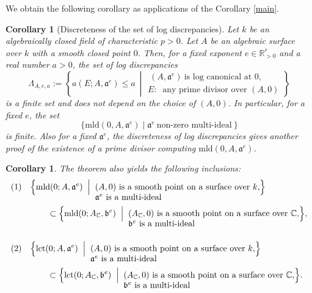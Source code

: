 \documentclass[a4paper]{amsart}
\def\RR{{\mathbb{R}}}
\def\CC{{\mathbb{C}}}
\renewcommand{\a}{{\mathfrak{a}}}
\newcommand{\mld}{{\mathrm{mld}}}
\newcommand{\lct}{{\operatorname{lct}}}
\newtheorem{cor}[thm]{Corollary}
\theoremstyle{definition}
\begin{document}
We obtain the following corollary as  applications of the Corollary \ref{main}.
 
   \begin{cor}[Discreteness of the set of log discrepancies]\label{equal-p-0}   Let  $k$ be an algebraically closed field of 
       characteristic $p>0$.
       Let $A$ be an algebraic surface over $k$ with a smooth closed point $0$. 
              Then, 
            for a fixed exponent $e\in \RR_{>0}^r$ and a real number $a>0$, the set of log discrepancies 
         $$\Lambda_{A,e,a}:=\left\{a(E;A,\a^e) \leq a \ \middle | \begin{array}{l}\ (A, \a^e)\ \mbox{is\ log\ canonical\ at $0$}, 
         \\ E:\ \mbox{\ any \ prime divisor\ over } (A,0) \end{array}\right\} $$
         is a finite set and does not depend on the choice of $(A,0)$.   
         In particular, for a  fixed  $e$, the set 
         $$\{\mld(0,A, \a^e) \mid \a^e\ \mbox{non-zero\ multi-ideal}\ \}$$ 
         is finite.
         Also for a fixed $\a^e$, the discreteness of log discrepancies gives another proof of  the existence of a prime divisor computing $\mld(0,A, \a^e)$.
    \end{cor}

\begin{cor}\label{mld-contain}
  The theorem also yields the following inclusions:
\[
\begin{aligned}
(1)\quad
&\Bigl\{
   \mld(0;A,\mathfrak a^e)
   \;\Bigm|\;
   \begin{array}[t]{@{}l@{}}
     (A,0)\text{ is a smooth point on a surface over }k,\\
     \mathfrak a^e\text{ is a multi-ideal}
   \end{array}
 \Bigr\} \\
&\qquad\subset
 \Bigl\{
   \mld(0;A_{\CC},\mathfrak b^e)
   \;\Bigm|\;
   \begin{array}[t]{@{}l@{}}
     (A_{\CC},0)\text{ is a smooth point on a surface over }\CC,\\
     \mathfrak b^e\text{ is a multi-ideal}
   \end{array}
 \Bigr\}, \\[1em]
(2)\quad
&\Bigl\{
   \lct(0;A,\mathfrak a^e)
   \;\Bigm|\;
   \begin{array}[t]{@{}l@{}}
     (A,0)\text{ is a smooth point on a surface over }k,\\
     \mathfrak a^e\text{ is a multi-ideal}
   \end{array}
 \Bigr\} \\
&\qquad\subset
 \Bigl\{
   \lct(0;A_{\CC},\mathfrak b^e)
   \;\Bigm|\;
   \begin{array}[t]{@{}l@{}}
     (A_{\CC},0)\text{ is a smooth point on a surface over }\CC,\\
     \mathfrak b^e\text{ is a multi-ideal}
   \end{array}
 \Bigr\}.
\end{aligned}
\]
\end{cor}
   
\end{document}
